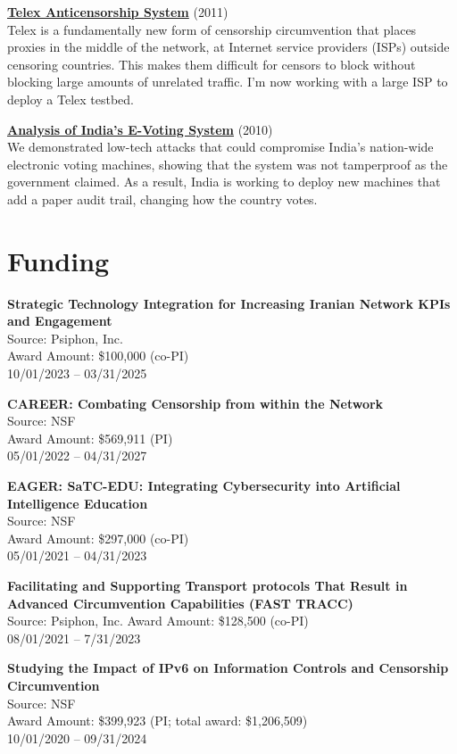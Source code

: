 \documentclass[margin,11pt]{res} %
\begin{document}
\textbf{\href{https://telex.cc/}{Telex Anticensorship System}} (2011)\\
Telex is a fundamentally new form of censorship circumvention that places proxies in the middle of the network, at Internet service providers (ISPs) outside censoring countries.  This makes them difficult for censors to block without blocking large amounts of unrelated traffic. I'm now working with a large ISP to deploy a Telex testbed.

\textbf{\href{http://indiaevm.org/}{Analysis of India's E-Voting System}} (2010)\\
We demonstrated low-tech attacks that could compromise India's nation-wide electronic voting machines, showing that the system was not tamperproof as the government claimed.  As a result, India is working to deploy new machines that add a paper audit trail, changing how the country votes.
\fi

\section{\large Funding}

\textbf{Strategic Technology Integration for Increasing Iranian Network KPIs and Engagement} \\
Source: Psiphon, Inc. \\
Award Amount: \$100,000 (co-PI) \\
10/01/2023 -- 03/31/2025

\textbf{CAREER: Combating Censorship from within the Network} \\
Source: NSF \\
Award Amount: \$569,911 (PI) \\
05/01/2022 -- 04/31/2027

\textbf{EAGER: SaTC-EDU: Integrating Cybersecurity into Artificial Intelligence Education} \\
Source: NSF \\
Award Amount: \$297,000 (co-PI) \\
05/01/2021 -- 04/31/2023


\textbf{Facilitating and Supporting Transport protocols That Result in Advanced Circumvention Capabilities (FAST TRACC)} \\
Source: Psiphon, Inc.
Award Amount: \$128,500 (co-PI) \\
08/01/2021 -- 7/31/2023

\textbf{Studying the Impact of IPv6 on Information Controls and Censorship Circumvention} \\
Source: NSF \\
Award Amount: \$399,923 (PI; total award: \$1,206,509) \\
10/01/2020 -- 09/31/2024
\end{document}
